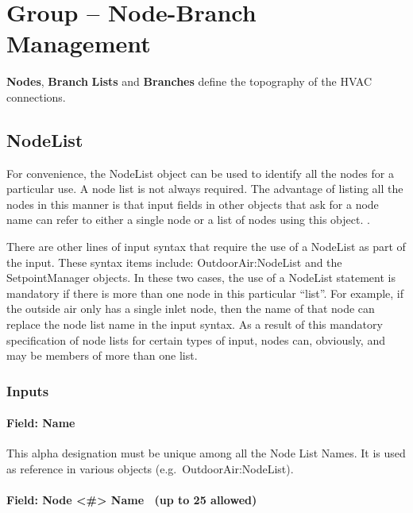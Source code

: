 \section{Group -- Node-Branch Management}\label{group-node-branch-management}

\textbf{Nodes}, \textbf{Branch} \textbf{Lists} and \textbf{Branches} define the topography of the HVAC connections.

\subsection{NodeList}\label{nodelist}

For convenience, the NodeList object can be used to identify all the nodes for a particular use. A node list is not always required. The advantage of listing all the nodes in this manner is that input fields in other objects that ask for a node name can refer to either a single node or a list of nodes using this object. .

There are other lines of input syntax that require the use of a NodeList as part of the input. These syntax items include: OutdoorAir:NodeList and the SetpointManager objects. In these two cases, the use of a NodeList statement is mandatory if there is more than one node in this particular ``list''. For example, if the outside air only has a single inlet node, then the name of that node can replace the node list name in the input syntax. As a result of this mandatory specification of node lists for certain types of input, nodes can, obviously, and may be members of more than one list.

\subsubsection{Inputs}\label{inputs-027}

\paragraph{Field: Name}\label{field-name-026}

This alpha designation must be unique among all the Node List Names. It is used as reference in various objects (e.g.~OutdoorAir:NodeList).

\paragraph{Field: Node \textless{}\#\textgreater{} Name ~(up to 25 allowed)}\label{field-node-name-up-to-25-allowed}

